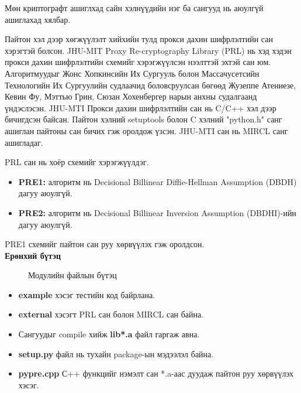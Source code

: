 Мөн криптографт ашиглхад сайн хэлнүүдийн нэг ба сангууд нь аюулгүй ашиглахад хялбар.\cite{cryptographyTopLanguaes}

Пайтон хэл дээр хөгжүүлэлт хийхийн тулд прокси дахин шифрлэлтийн сан хэрэгтэй болсон.
JHU-MIT Proxy Re-cryptography Library (PRL) нь хэд хэдэн прокси дахин шифрлэлтийн схемийг хэрэгжүүлсэн нээлттэй эхтэй сан юм. Алгоритмуудыг Жонс Хопкинсийн Их Сургууль болон Массачусетсийн Технологийн Их Сургуулийн судлаачид боловсруулсан бөгөөд Жузеппе Атениезе, Кевин Фу, Мэттью Грин, Сюзан Хохенбергер нарын анхны судалгаанд үндэслэсэн.
JHU-MTI Прокси дахин шифрлэлтийн сан нь C/C++ хэл дээр бичигдсэн байсан. Пайтон хэлний setuptools болон C хэлний "python.h" санг ашиглан пайтоны сан бичих гэж оролдож үзсэн. JHU-MTI сан нь MIRCL санг ашигладаг.

PRL сан нь хоёр схемийг хэрэгжүүлдэг.
\begin{itemize}
    \item \textbf{PRE1:} алгоритм нь Decisional Billinear Diffie-Hellman Assumption (DBDH) дагуу аюулгүй.
    \item \textbf{PRE2:} алгоритм нь Decisional Billinear Inversion Assumption (DBDHI)-ийн дагуу аюулгүй.
\end{itemize}

PRE1 схемийг пайтон сан руу хөрвүүлэх гэж оролдсон.\\
\textbf{Ерөнхий бүтэц}

\begin{figure}
    \caption{Модулийн файлын бүтэц}
\end{figure}

\begin{itemize}
    \item \textbf{example} хэсэг тестийн код байрлана.
    \item \textbf{external} хэсэгт PRL сан болон MIRCL сан байна.
    \item Сангуудыг compile хийж \textbf{lib*.a} файл гаргаж авна.
    \item \textbf{setup.py} файл нь тухайн package-ын мэдээлэл байна.
    \item \textbf{pypre.cpp} С++ функцийг нэмэлт сан *.a-аас дуудаж пайтон руу хөрвүүлэх хэсэг.
\end{itemize}

